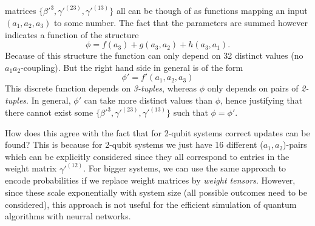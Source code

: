 \documentclass[a4]{article}
\begin{document}
matrices $\{\beta'^3,\gamma'^{(23)},\gamma'^{(13)}\}$ all can be though of as
functions mapping an input $(a_1,a_2,a_3)$ to some number. The fact that the
parameters are summed however indicates a function of the structure
\begin{equation}
    \phi = f(a_3) + g(a_3,a_2) + h(a_3,a_1).
\end{equation}
Because of this structure the function can only depend on 32 distinct values
(no $a_1a_2$-coupling). But the right hand side in general is of the form
\begin{equation}
    \phi' = f'(a_1,a_2,a_3)
\end{equation}
This discrete function depends on \textit{3-tuples}, whereas $\phi$ only depends
on pairs of \textit{2-tuples}. In general, $\phi'$ can take more distinct values
than $\phi$, hence justifying that there cannot exist some $\{\beta'^3,
\gamma'^{(23)},\gamma'^{(13)}\}$ such that $\phi=\phi'$. \par
How does this agree with the fact that for 2-qubit systems correct updates
can be found? This is because for 2-qubit systems we just have 16 different
($a_1,a_2$)-pairs which can be explicitly considered since they all correspond
to entries in the weight matrix $\gamma'^{(12)}$. For bigger systems, we can
use the same approach to encode probabilities if we replace weight matrices by
\textit{weight tensors}. However, since these scale exponentially with system
size (all possible outcomes need to be considered), this approach is not useful
for the efficient simulation of quantum algorithms with neurral networks.
\end{document}
